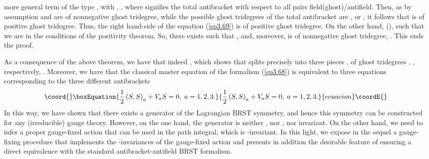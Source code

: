 \documentclass[a4paper,12pt]{article}
\begin{document}
more general term of the type \coordHE{}, with \coordHE{}, \coordHE{}, where \myHighlight{$\left( ,\right) $}\coordHE{} signifies
the total antibracket with respect to all pairs field(ghost)/antifield.
Then, as by assumption \coordHE{} and \coordHE{} are of
nonnegative ghost tridegree, while the possible ghost tridegrees of the
total antibracket are \coordHE{}, \coordHE{} or \coordHE{}, it follows that \coordHE{} is of positive ghost tridegree. Thus, the right hand-side
of the equation (\ref{sp3.69}) is of positive ghost tridegree. On the other
hand, \coordHE{} (\coordHE{}), such that we are in the
conditions of the positivity theorem. So, there exists \coordHE{}
such that \coordHE{}, and, moreover, \coordHE{} is of nonnegative ghost tridegree, \coordHE{}. This ends the proof.

As a consequence of the above theorem, we have that indeed \coordHE{}, which shows that \coordHE{} splits
precisely into three pieces \coordHE{}, of ghost
tridegrees \coordHE{}, \coordHE{}, respectively, \coordHE{}. Moreover, we have that the classical master equation
of the \coordHE{} formalism (\ref{sp3.68}) is equivalent to three equations
corresponding to the three different antibrackets 
\begin{equation}\coord{}\boxEquation{
\frac{1}{2}\left( S,S\right) _{a}+V_{a}S=0,\;a=1,2,3.  \label{sp3.82}
}{
\frac{1}{2}\left( S,S\right) _{a}+V_{a}S=0,\;a=1,2,3.  }{ecuacion}\coordE{}\end{equation}
In this way, we have shown that there exists a generator of the Lagrangian
BRST \coordHE{} symmetry, and hence this symmetry can be
constructed for any (irreducible) gauge theory. However, on the one hand,
the generator \coordHE{} is neither \coordHE{}, nor \coordHE{}, nor \coordHE{} invariant. On
the other hand, we need to infer a proper gauge-fixed action that can be
used in the path integral, which is \coordHE{}-invariant. In this light, we
expose in the sequel a gauge-fixing procedure that implements the \coordHE{}%
-invariances of the gauge-fixed action and presents in addition the
desirable feature of ensuring a direct equivalence with the standard
antibracket-antifield BRST formalism.
\end{document}
